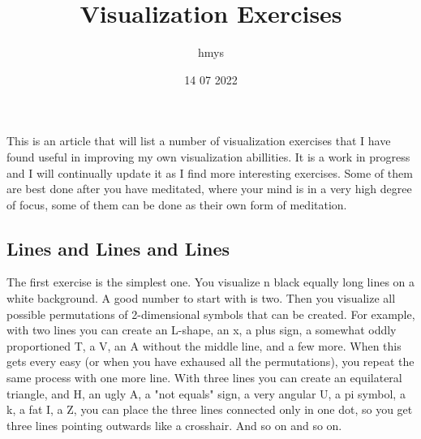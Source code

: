 \title{Visualization Exercises}
\author{hmys}
\date{14 07 2022}

\maketitle

\par
This is an article that will list a number of visualization exercises that I have found useful in improving my own visualization abillities. It is a work in progress and I will continually update it as I find more interesting exercises. Some of them are best done after you have meditated, where your mind is in a very high degree of focus, some of them can be done as their own form of meditation.
\par
\subsection{Lines and Lines and Lines} The first exercise is the simplest one. You visualize n black equally long lines on a white background. A good number to start with is two. Then you visualize all possible permutations of 2-dimensional symbols that can be created. For example, with two lines you can create an L-shape, an x, a plus sign, a somewhat oddly proportioned T, a V, an A without the middle line, and a few more. When this gets every easy (or when you have exhaused all the permutations), you repeat the same process with one more line. With three lines you can create an equilateral triangle, and H, an ugly A, a "not equals" sign, a very angular U, a pi symbol, a k, a fat I, a Z, you can place the three lines connected only in one dot, so you get three lines pointing outwards like a crosshair. And so on and so on. 
\par
